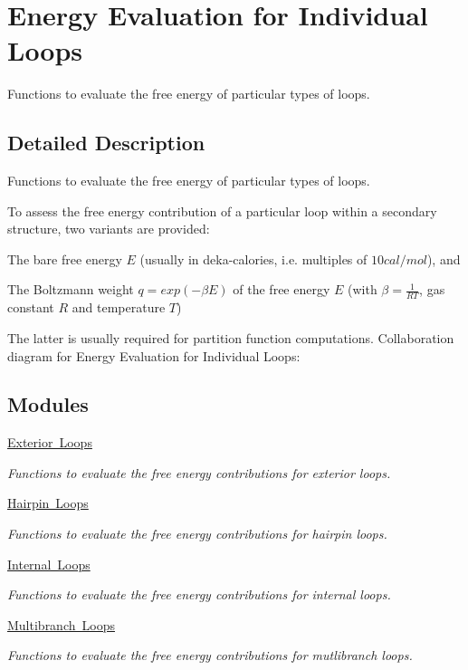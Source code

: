 \hypertarget{group__eval__loops}{}\section{Energy Evaluation for Individual Loops}
\label{group__eval__loops}


Functions to evaluate the free energy of particular types of loops.  




\subsection{Detailed Description}
Functions to evaluate the free energy of particular types of loops. 

To assess the free energy contribution of a particular loop within a secondary structure, two variants are provided\+:
\begin{DoxyItemize}
\item The {\ttfamily bare} free energy $E$ (usually in deka-\/calories, i.\+e. multiples of $10 cal/mol$), and
\item The {\ttfamily Boltzmann weight} $q = exp(-\beta E)$ of the free energy $E$ (with $\beta = \frac{1}{RT}$, gas constant $R$ and temperature $T$)
\end{DoxyItemize}

The latter is usually required for partition function computations. Collaboration diagram for Energy Evaluation for Individual Loops\+:
\subsection*{Modules}
\begin{DoxyCompactItemize}
\item 
\mbox{\hyperlink{group__eval__loops__ext}{Exterior Loops}}
\begin{DoxyCompactList}\small\item\em Functions to evaluate the free energy contributions for exterior loops. \end{DoxyCompactList}\item 
\mbox{\hyperlink{group__eval__loops__hp}{Hairpin Loops}}
\begin{DoxyCompactList}\small\item\em Functions to evaluate the free energy contributions for hairpin loops. \end{DoxyCompactList}\item 
\mbox{\hyperlink{group__eval__loops__int}{Internal Loops}}
\begin{DoxyCompactList}\small\item\em Functions to evaluate the free energy contributions for internal loops. \end{DoxyCompactList}\item 
\mbox{\hyperlink{group__eval__loops__mb}{Multibranch Loops}}
\begin{DoxyCompactList}\small\item\em Functions to evaluate the free energy contributions for mutlibranch loops. \end{DoxyCompactList}\end{DoxyCompactItemize}
